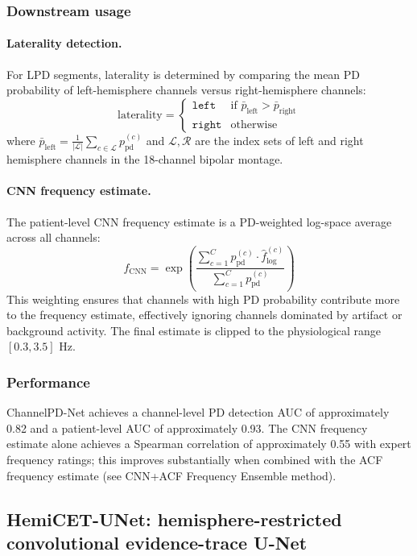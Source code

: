 \subsubsection{Downstream usage}

\paragraph{Laterality detection.}
For LPD segments, laterality is determined by comparing the mean PD probability of left-hemisphere channels versus right-hemisphere channels:
\[ \mathrm{laterality} = \begin{cases} \texttt{left} & \text{if } \bar{p}_{\mathrm{left}} > \bar{p}_{\mathrm{right}} \\ \texttt{right} & \text{otherwise} \end{cases} \tag{12} \]
where $\bar{p}_{\mathrm{left}} = \frac{1}{|\mathcal{L}|}\sum_{c \in \mathcal{L}} p_{\mathrm{pd}}^{(c)}$ and $\mathcal{L}, \mathcal{R}$ are the index sets of left and right hemisphere channels in the 18-channel bipolar montage.

\paragraph{CNN frequency estimate.}
The patient-level CNN frequency estimate is a PD-weighted log-space average across all channels:
\[ f_{\mathrm{CNN}} = \exp\!\left(\frac{\sum_{c=1}^{C} p_{\mathrm{pd}}^{(c)} \cdot \hat{f}_{\log}^{(c)}}{\sum_{c=1}^{C} p_{\mathrm{pd}}^{(c)}}\right) \tag{13} \]
This weighting ensures that channels with high PD probability contribute more to the frequency estimate, effectively ignoring channels dominated by artifact or background activity. The final estimate is clipped to the physiological range $[0.3, 3.5]$ Hz.

\subsubsection{Performance}

ChannelPD-Net achieves a channel-level PD detection AUC of approximately 0.82 and a patient-level AUC of approximately 0.93. The CNN frequency estimate alone achieves a Spearman correlation of approximately 0.55 with expert frequency ratings; this improves substantially when combined with the ACF frequency estimate (see CNN+ACF Frequency Ensemble method).

\subsection{HemiCET-UNet: hemisphere-restricted convolutional evidence-trace U-Net}
\label{app:hemicet}


